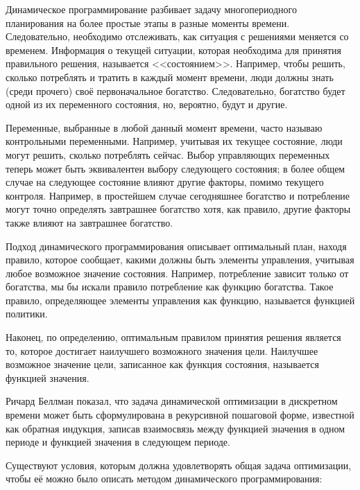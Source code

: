 Динамическое программирование разбивает задачу многопериодного планирования на более простые этапы в разные моменты времени. Следовательно, необходимо отслеживать, как ситуация с решениями меняется со временем. Информация о текущей ситуации, которая необходима для принятия правильного решения, называется <<состоянием>>. Например, чтобы решить, сколько потреблять и тратить в каждый момент времени, люди должны знать (среди прочего) своё первоначальное богатство. Следовательно, богатство будет одной из их переменного состояния, но, вероятно, будут и другие.

Переменные, выбранные в любой данный момент времени, часто называю контрольными переменными. Например, учитывая их текущее состояние, люди могут решить, сколько потреблять сейчас. Выбор управляющих переменных теперь может быть эквивалентен выбору следующего состояния; в более общем случае на следующее состояние влияют другие факторы, помимо текущего контроля. Например, в простейшем случае сегодняшнее богатство и потребление могут точно определять завтрашнее богатство хотя, как правило, другие факторы также влияют на завтрашнее богатство.

Подход динамического программирования описывает оптимальный план, находя правило, которое сообщает, какими должны быть элементы управления, учитывая любое возможное значение состояния. Например, потребление зависит только от богатства, мы бы искали правило потребление как функцию богатства. Такое правило, определяющее элементы управления как функцию, называется функцией политики.

Наконец, по определению, оптимальным правилом принятия решения является то, которое достигает наилучшего возможного значения цели. Наилучшее возможное значение цели, записанное как функция состояния, называется функцией значения.

Ричард Беллман показал, что задача динамической оптимизации в дискретном времени может быть сформулирована в рекурсивной пошаговой форме, известной как обратная индукция, записав взаимосвязь между функцией значения в одном периоде и функцией значения в следующем периоде.

Существуют условия, которым должна удовлетворять общая задача оптимизации, чтобы её можно было описать методом динамического программирования:
